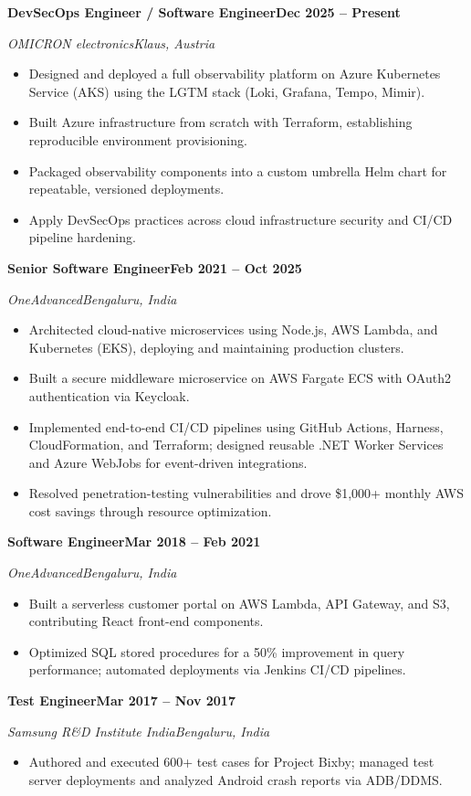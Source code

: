 \documentclass[a4paper,10pt]{article}
\newcommand{\role}[4]{%
  \vspace{0.22em}%
  \noindent\textbf{#1}\hfill\textbf{#2}\par
  \noindent\textit{#3}\hfill\textit{#4}\par
  \vspace{-0.3em}%
}
\begin{document}
\role{DevSecOps Engineer / Software Engineer}{Dec 2025 -- Present}{OMICRON electronics}{Klaus, Austria}
\begin{itemize}
  \item Designed and deployed a full observability platform on Azure Kubernetes Service (AKS) using the LGTM stack (Loki, Grafana, Tempo, Mimir).
  \item Built Azure infrastructure from scratch with Terraform, establishing reproducible environment provisioning.
  \item Packaged observability components into a custom umbrella Helm chart for repeatable, versioned deployments.
  \item Apply DevSecOps practices across cloud infrastructure security and CI/CD pipeline hardening.
\end{itemize}

\role{Senior Software Engineer}{Feb 2021 -- Oct 2025}{OneAdvanced}{Bengaluru, India}
\begin{itemize}
  \item Architected cloud-native microservices using Node.js, AWS Lambda, and Kubernetes (EKS), deploying and maintaining production clusters.
  \item Built a secure middleware microservice on AWS Fargate ECS with OAuth2 authentication via Keycloak.
  \item Implemented end-to-end CI/CD pipelines using GitHub Actions, Harness, CloudFormation, and Terraform; designed reusable .NET Worker Services and Azure WebJobs for event-driven integrations.
  \item Resolved penetration-testing vulnerabilities and drove \$1,000+ monthly AWS cost savings through resource optimization.
\end{itemize}

\role{Software Engineer}{Mar 2018 -- Feb 2021}{OneAdvanced}{Bengaluru, India}
\begin{itemize}
  \item Built a serverless customer portal on AWS Lambda, API Gateway, and S3, contributing React front-end components.
  \item Optimized SQL stored procedures for a 50\% improvement in query performance; automated deployments via Jenkins CI/CD pipelines.
\end{itemize}

\role{Test Engineer}{Mar 2017 -- Nov 2017}{Samsung R\&D Institute India}{Bengaluru, India}
\begin{itemize}
  \item Authored and executed 600+ test cases for Project Bixby; managed test server deployments and analyzed Android crash reports via ADB/DDMS.
\end{itemize}
\end{document}
